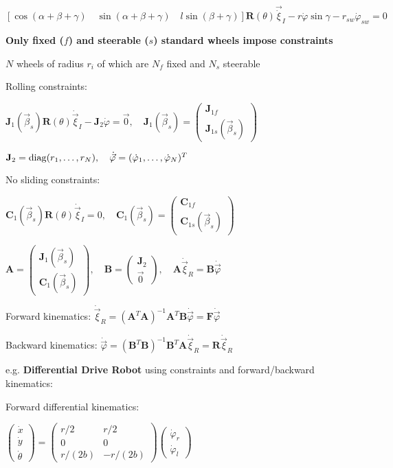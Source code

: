 \documentclass[fontsize=6pt]{scrartcl}
\newcommand{\mat}[1]{\mathbf{#1}}
\begin{document}
\begin{multicols*}{4}
$ \left[ \cos(\alpha + \beta + \gamma) \quad \sin(\alpha + \beta + \gamma) \quad l\sin(\beta + \gamma)\right]\mat R(\theta) \vec\dot{\xi}_I - r\dot{\varphi}\sin\gamma - r_{sw}\dot{\varphi}_{sw}= 0$

\textbf{Only fixed ($f$) and steerable ($s$) standard wheels impose constraints}

$N$ wheels of radius $r_i$ of which are $N_f$ fixed and $N_s$ steerable

Rolling constraints: 

$ \mat J_1(\vec\beta_s) \mat R(\theta) \dot{\vec{\xi}}_I - \mat J_2 \dot{\varphi} = \vec 0, \quad \mat J_1(\vec\beta_s) = 
\begin{pmatrix}
\mat J_{1f}\\
\mat J_{1s}(\vec\beta_s)
\end{pmatrix}$

$
\mat J_2 = \diag(r_1, \ldots, r_N), \quad \dot{\vec \varphi} = (\dot{\varphi}_1, \ldots, \dot{\varphi}_N)^T
$

No sliding constraints:

$\mat C_1(\vec \beta_s) \mat R(\theta) \dot{\vec{\xi}}_I = 0, \quad
\mat C_1(\vec \beta_s) = 
\begin{pmatrix}
\mat C_{1f}\\
\mat C_{1s}(\vec\beta_s)
\end{pmatrix}
$

$ \mat A = 
\begin{pmatrix}
\mat J_1(\vec{\beta}_s)\\
\mat C_1(\vec \beta_s)
\end{pmatrix}
, \quad 
\mat B = 
\begin{pmatrix}
\mat J_2\\
\vec{0}
\end{pmatrix}, \quad
\mat A \dot{\vec \xi}_R = \mat B \dot{\vec{\varphi}}
$

Forward kinematics: $ \dot{\vec{\xi}}_R = (\mat A^T \mat A)^{-1}\mat A^T \mat B \dot{\vec{\varphi}} = \mat F \dot{\vec{\varphi}}$

Backward kinematics: $ \dot{\vec{\varphi}} = (\mat B^T \mat B)^{-1}\mat B^T \mat A \dot{\vec{\xi}}_R = \mat R \dot{\vec{\xi}}_R$

\begin{minipage}{0.65\linewidth}
e.g. \textbf{Differential Drive Robot} using constraints and forward/backward kinematics:	
	
Forward differential kinematics:

$
\begin{pmatrix}
\dot x\\ \dot y\\ \dot \theta
\end{pmatrix}
=
\begin{pmatrix}
r/2 & r/2\\
0 & 0\\
r/(2b) & -r/(2b)
\end{pmatrix}
\begin{pmatrix}
\dot\varphi_r\\
\dot\varphi_l
\end{pmatrix}
$


\end{minipage}
\end{multicols*}
\end{document}
